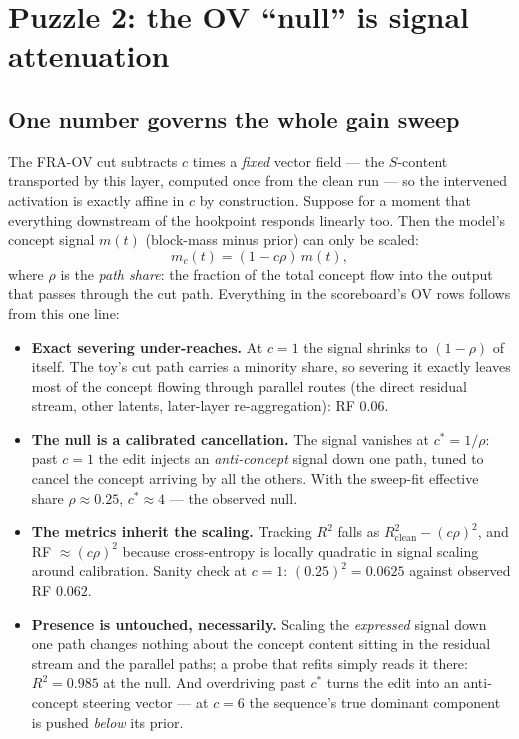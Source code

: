 \documentclass{article}
\begin{document}
\section{Puzzle 2: the OV ``null'' is signal attenuation}\label{sec:ov}

\subsection{One number governs the whole gain sweep}

The FRA-OV cut subtracts $c$ times a \emph{fixed} vector field --- the $S$-content transported by this layer, computed once from the clean run --- so the intervened activation is exactly affine in $c$ by construction. Suppose for a moment that everything downstream of the hookpoint responds linearly too. Then the model's concept signal $m(t)$ (block-mass minus prior) can only be scaled:
\begin{equation}\label{eq:attenuation}
    m_c(t) = (1 - c\rho)\, m(t),
\end{equation}
where $\rho$ is the \emph{path share}: the fraction of the total concept flow into the output that passes through the cut path. Everything in the scoreboard's OV rows follows from this one line:
\begin{itemize}
    \item \textbf{Exact severing under-reaches.} At $c = 1$ the signal shrinks to $(1 - \rho)$ of itself. The toy's cut path carries a minority share, so severing it exactly leaves most of the concept flowing through parallel routes (the direct residual stream, other latents, later-layer re-aggregation): RF $0.06$.
    \item \textbf{The null is a calibrated cancellation.} The signal vanishes at $c^* = 1/\rho$: past $c = 1$ the edit injects an \emph{anti-concept} signal down one path, tuned to cancel the concept arriving by all the others. With the sweep-fit effective share $\rho \approx 0.25$, $c^* \approx 4$ --- the observed null.
    \item \textbf{The metrics inherit the scaling.} Tracking $R^2$ falls as $R^2_{\mathrm{clean}} - (c\rho)^2$, and RF $\approx (c\rho)^2$ because cross-entropy is locally quadratic in signal scaling around calibration. Sanity check at $c = 1$: $(0.25)^2 = 0.0625$ against observed RF $0.062$.
    \item \textbf{Presence is untouched, necessarily.} Scaling the \emph{expressed} signal down one path changes nothing about the concept content sitting in the residual stream and the parallel paths; a probe that refits simply reads it there: $R^2 = 0.985$ at the null. And overdriving past $c^*$ turns the edit into an anti-concept steering vector --- at $c = 6$ the sequence's true dominant component is pushed \emph{below} its prior.
\end{itemize}
\end{document}
